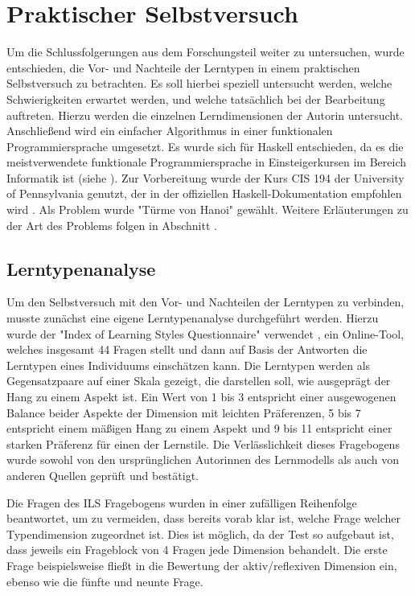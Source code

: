 \clearpage
\section{Praktischer Selbstversuch}
\label{sec:practice}

Um die Schlussfolgerungen aus dem Forschungsteil weiter zu untersuchen, wurde entschieden, die Vor- und Nachteile der Lerntypen in einem praktischen Selbstversuch zu betrachten.
Es soll hierbei speziell untersucht werden, welche Schwierigkeiten erwartet werden, und welche tatsächlich bei der Bearbeitung auftreten.
Hierzu werden die einzelnen Lerndimensionen der Autorin untersucht. Anschließend wird ein einfacher Algorithmus in einer funktionalen Programmiersprache umgesetzt. Es wurde sich für Haskell entschieden, da es die meistverwendete funktionale Programmiersprache in Einsteigerkursen im Bereich Informatik ist (siehe ).
Zur Vorbereitung wurde der Kurs CIS 194 \cite{cis194} der University of Pennsylvania genutzt, der in der offiziellen Haskell-Dokumentation empfohlen wird \cite{haskelldoc}.
Als Problem wurde "Türme von Hanoi" gewählt. Weitere Erläuterungen zu der Art des Problems folgen in Abschnitt .

\subsection{Lerntypenanalyse}
Um den Selbstversuch mit den Vor- und Nachteilen der Lerntypen zu verbinden, musste zunächst eine eigene Lerntypenanalyse durchgeführt werden.
Hierzu wurde der "Index of Learning Styles Questionnaire" verwendet \cite{ils_questionnaire}, ein Online-Tool, welches insgesamt 44 Fragen stellt und dann auf Basis der Antworten die Lerntypen eines Individuums einschätzen kann. Die Lerntypen werden als Gegensatzpaare auf einer Skala gezeigt, die darstellen soll, wie ausgeprägt der Hang zu einem Aspekt ist. Ein Wert von 1 bis 3 entspricht einer ausgewogenen Balance beider Aspekte der Dimension mit leichten Präferenzen, 5 bis 7 entspricht einem mäßigen Hang zu einem Aspekt und 9 bis 11 entspricht einer starken Präferenz für einen der Lernstile.
Die Verlässlichkeit dieses Fragebogens wurde sowohl von den ursprünglichen Autorinnen des Lernmodells \cite{felder2005} als auch von anderen Quellen \cite{zywno} geprüft und bestätigt.

Die Fragen des ILS Fragebogens wurden in einer zufälligen Reihenfolge beantwortet, um zu vermeiden, dass bereits vorab klar ist, welche Frage welcher Typendimension zugeordnet ist. Dies ist möglich, da der Test so aufgebaut ist, dass jeweils ein Frageblock von 4 Fragen jede Dimension behandelt. Die erste Frage beispielsweise fließt in die Bewertung der aktiv/reflexiven Dimension ein, ebenso wie die fünfte und neunte Frage.

